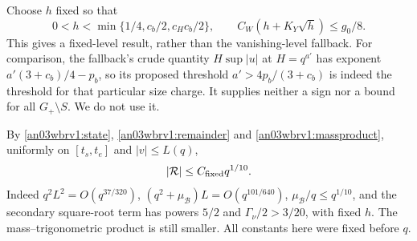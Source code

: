 \documentclass[11pt]{article}
\numberwithin{equation}{section}
\theoremstyle{remark}\newtheorem{remark}[theorem]{Remark}
\newcommand{\BB}{\mathcal B}\newcommand{\Gp}{{G_+}}
\begin{document}
Choose $h$ fixed so that
\begin{equation}
 0<h<\min\{1/4,c_b/2,c_Hc_b/2\},\qquad
 C_W(h+K_Y\sqrt h)\le g_0/8.
 \label{an03wbrv1:hfirst}
\end{equation}
This gives a fixed-level result, rather than the vanishing-level
fallback. For comparison, the fallback's crude quantity
$H\sup|u|$ at $H=q^{a'}$ has exponent
$a'(3+c_b)/4-p_b$, so its proposed threshold
$a'>4p_b/(3+c_b)$ is indeed the threshold for that particular
size charge. It supplies neither a sign nor a bound for all
$\Gp\setminus S$. We do not use it.

By \eqref{an03wbrv1:state}, \eqref{an03wbrv1:remainder} and
\eqref{an03wbrv1:massproduct}, uniformly on $[t_s,t_e]$ and
$|v|\le L(q)$,
\begin{equation}
 |\mathcal R|\le C_{\rm fixed}q^{1/10}.
 \label{an03wbrv1:finalremainder}
\end{equation}
Indeed $q^2L^2=O(q^{37/320})$,
$(q^2+\mu_\BB)L=O(q^{101/640})$,
$\mu_\BB/q\le q^{1/10}$, and the secondary square-root term
has powers $5/2$ and $\Gamma_\nu/2>3/20$, with fixed $h$.
The mass--trigonometric product is still smaller. All constants
here were fixed before $q$.
\end{document}
